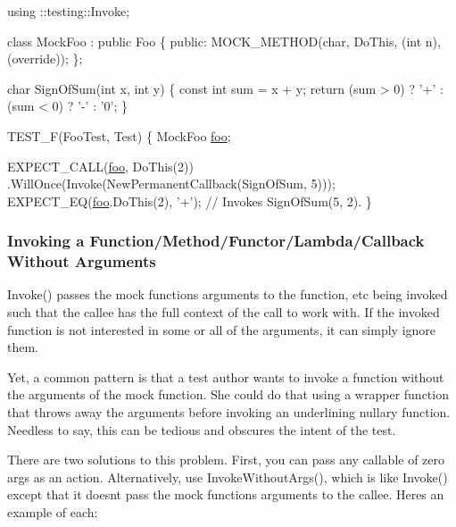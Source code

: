 \begin{DoxyCode}
using ::testing::Invoke;

\textcolor{keyword}{class }MockFoo : \textcolor{keyword}{public} Foo \{
 \textcolor{keyword}{public}:
  MOCK\_METHOD(\textcolor{keywordtype}{char}, DoThis, (\textcolor{keywordtype}{int} n), (\textcolor{keyword}{override}));
\};

\textcolor{keywordtype}{char} SignOfSum(\textcolor{keywordtype}{int} x, \textcolor{keywordtype}{int} y) \{
  \textcolor{keyword}{const} \textcolor{keywordtype}{int} sum = x + y;
  \textcolor{keywordflow}{return} (sum > 0) ? \textcolor{charliteral}{'+'} : (sum < 0) ? \textcolor{charliteral}{'-'} : \textcolor{charliteral}{'0'};
\}

TEST\_F(FooTest, Test) \{
  MockFoo \mbox{\hyperlink{namespacefoo}{foo}};

  EXPECT\_CALL(\mbox{\hyperlink{namespacefoo}{foo}}, DoThis(2))
      .WillOnce(Invoke(NewPermanentCallback(SignOfSum, 5)));
  EXPECT\_EQ(\mbox{\hyperlink{namespacefoo}{foo}}.DoThis(2), \textcolor{charliteral}{'+'});  \textcolor{comment}{// Invokes SignOfSum(5, 2).}
\}
\end{DoxyCode}


\subsubsection*{Invoking a Function/\+Method/\+Functor/\+Lambda/\+Callback Without Arguments}

{\ttfamily Invoke()} passes the mock function\textquotesingle{}s arguments to the function, etc being invoked such that the callee has the full context of the call to work with. If the invoked function is not interested in some or all of the arguments, it can simply ignore them.

Yet, a common pattern is that a test author wants to invoke a function without the arguments of the mock function. She could do that using a wrapper function that throws away the arguments before invoking an underlining nullary function. Needless to say, this can be tedious and obscures the intent of the test.

There are two solutions to this problem. First, you can pass any callable of zero args as an action. Alternatively, use {\ttfamily Invoke\+Without\+Args()}, which is like {\ttfamily Invoke()} except that it doesn\textquotesingle{}t pass the mock function\textquotesingle{}s arguments to the callee. Here\textquotesingle{}s an example of each\+:


